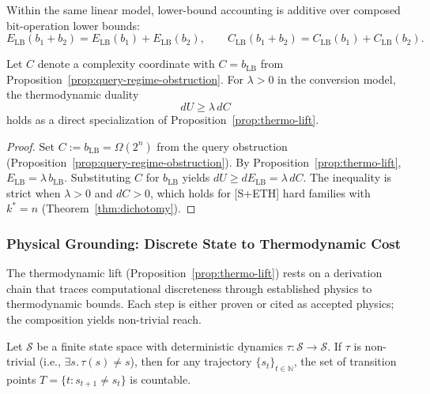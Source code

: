 \begin{proposition}\label{prop:thermo-conservation-additive}
Within the same linear model, lower-bound accounting is additive over composed bit-operation lower bounds:
\[
E_{\mathrm{LB}}(b_1+b_2)=E_{\mathrm{LB}}(b_1)+E_{\mathrm{LB}}(b_2),\qquad
C_{\mathrm{LB}}(b_1+b_2)=C_{\mathrm{LB}}(b_1)+C_{\mathrm{LB}}(b_2).
\]
\end{proposition}

\begin{corollary}\label{cor:neukart-vinokur}
Let $C$ denote a complexity coordinate with $C = b_{\mathrm{LB}}$ from Proposition~\ref{prop:query-regime-obstruction}. For $\lambda > 0$ in the conversion model, the thermodynamic duality
\[
dU \ge \lambda\,dC
\]
holds as a direct specialization of Proposition~\ref{prop:thermo-lift}.
\end{corollary}

\begin{proof}
Set $C := b_{\mathrm{LB}} = \Omega(2^n)$ from the query obstruction (Proposition~\ref{prop:query-regime-obstruction}). By Proposition~\ref{prop:thermo-lift}, $E_{\mathrm{LB}} = \lambda\,b_{\mathrm{LB}}$. Substituting $C$ for $b_{\mathrm{LB}}$ yields $dU \ge dE_{\mathrm{LB}} = \lambda\,dC$. The inequality is strict when $\lambda > 0$ and $dC > 0$, which holds for [S+ETH] hard families with $k^* = n$ (Theorem~\ref{thm:dichotomy}).
\end{proof}

\subsubsection{Physical Grounding: Discrete State to Thermodynamic Cost}\label{sec:discrete-spacetime-chain}

The thermodynamic lift (Proposition~\ref{prop:thermo-lift}) rests on a derivation chain that traces computational discreteness through established physics to thermodynamic bounds. Each step is either proven or cited as accepted physics; the composition yields non-trivial reach.

\begin{proposition}\label{prop:discrete-state-time}
Let $\mathcal{S}$ be a finite state space with deterministic dynamics $\tau : \mathcal{S} \to \mathcal{S}$. If $\tau$ is non-trivial (i.e., $\exists s.\, \tau(s) \neq s$), then for any trajectory $\{s_t\}_{t \in \mathbb{N}}$, the set of transition points $T = \{t : s_{t+1} \neq s_t\}$ is countable.
\end{proposition}


